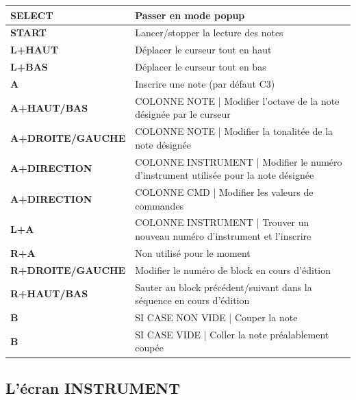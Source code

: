 \documentclass[12pt,a4paper]{article}
\begin{document}
        \tablelasttail{\hline}
        \begin{supertabular}{|l|p{11cm}|}
        \hline
            {\bf SELECT} & Passer en mode popup \\
            \hline
            {\bf START} & Lancer/stopper la lecture des notes \\
            \hline
            {\bf L+HAUT} & Déplacer le curseur tout en haut \\
            \hline
            {\bf L+BAS} & Déplacer le curseur tout en bas \\
            \hline
            {\bf A} & Inscrire une note (par défaut C3) \\
            \hline
            {\bf A+HAUT/BAS} & COLONNE NOTE | Modifier l'octave de la note désignée par le curseur \\
            \hline
            {\bf A+DROITE/GAUCHE} & COLONNE NOTE | Modifier la tonalitée de la note désignée \\
            \hline
            {\bf A+DIRECTION} & COLONNE INSTRUMENT | Modifier le numéro d'instrument utilisée pour la note désignée \\
            \hline
            {\bf A+DIRECTION} & COLONNE CMD | Modifier les valeurs de commandes \\
            \hline
            {\bf L+A} & COLONNE INSTRUMENT | Trouver un nouveau numéro d'instrument et l'inscrire \\
            \hline
            {\bf R+A} & Non utilisé pour le moment \\
            \hline
            {\bf R+DROITE/GAUCHE} & Modifier le numéro de block en cours d'édition \\
            \hline
            {\bf R+HAUT/BAS} & Sauter au block précédent/suivant dans la séquence en cours d'édition \\
            \hline
            {\bf B} & SI CASE NON VIDE | Couper la note \\
            \hline
            {\bf B} & SI CASE VIDE | Coller la note préalablement coupée \\
        \hline
        \end{supertabular}
    
    \subsection{L'écran INSTRUMENT}
    
\end{document}
